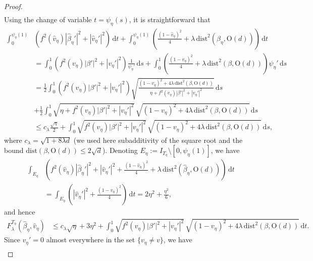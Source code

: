 \documentclass[a4paper,reqno]{amsart}
\newcommand\dist{{\mathrm{dist}}}
\newcommand\dt{{\,\mathrm{d}t}}
\theoremstyle{remark}
\newcommand\ds{{\,\mathrm{d}s}}
\newcommand{\On}{\mathrm{O}(d)}
\numberwithin{equation}{section}
\begin{document}
\begin{proof}
\begin{equation*}
\begin{split}
	\end{split}
\end{equation*}
Using the change of variable $t=\psi_\eta(s)$, it is straightforward that
\[
\begin{split}
	\int_{0}^{\psi_\eta(1)} & \left(f^2(\widehat{v}_\eta) |\widehat{\beta}_\eta'|^2  + |\widehat{v}_\eta'|^2\right)\dt + \int_{0}^{\psi_\eta(1)}  \left(\frac{(1-\widehat{v}_\eta)^2}{4} +\lambda \,\dist^2(\widehat{\beta}_\eta, \On) \right) \dt 
	\\ &
	= \int_{0}^{1}  \left(f^2({v}_\eta) |\beta'|^2  + |{v}_\eta'|^2\right)\frac{1}{\psi_\eta'}\ds  + 
	\int_{0}^{1}  \left(\frac{(1-{v}_\eta)^2}{4} +\lambda \,\dist^2(\beta, \On) \right) \psi_\eta'\ds
	\\ &
	= \frac{1}{2}\int_{0}^{1} \left(f^2({v}_\eta) |\beta'|^2  + |{v}_\eta'|^2\right)
	\sqrt{\frac{(1-v_\eta)^2 + 4 \lambda \, \dist^2(\beta, \On)}{\eta + f^2(v_\eta) |\beta'|^2+|v_\eta'|^2}}  
	\ds
	\\ & 
	+  \frac{1}{2} \int_{0}^{1}  \sqrt{\eta + f^2(v_\eta) |\beta'|^2+|v_\eta'|^2}\,  \sqrt{(1-v_\eta)^2 + 4 \lambda \, \dist^2(\beta, \On)}\ds
	\\ &
	\leq c_\lambda \frac{\sqrt{\eta}}{2}
	 +  \int_{0}^{1}  \sqrt{f^2(v_\eta) |\beta'|^2+|v_\eta'|^2}\, \sqrt{(1-v_\eta)^2 + 4 \lambda \, \dist^2(\beta, \On)}\ds,
\end{split}
\]
where $c_\lambda=\sqrt{1+8\lambda d}$
(we used here subadditivity of the square root and the bound $\dist(\beta,\On)\le 2\sqrt d$).
Denoting $E_\eta:= I_{T_\eta}  \setminus [0, \psi_\eta(1)]$, we have
\[
\begin{split}
	\int_{E_\eta} & \left(f^2(\widehat{v}_\eta) |\widehat{\beta}_\eta'|^2  + |\widehat{v}_\eta'|^2 + \frac{(1-\widehat{v}_\eta)^2}{4} +\lambda \,\dist^2(\widehat{\beta}_\eta, \On) \right) \dt 
	\\ &
	= \int_{E_\eta}  \left(|\widehat{v}_\eta'|^2 + \frac{(1-\widehat{v}_\eta)^2}{4}  \right) \dt = 2 \eta^2 + \frac{\eta^2}{6},
\end{split}
\]
and hence 
\[
\begin{split}
	F^{T_\eta}_\lambda(\widehat{\beta}_\eta, \widehat{v}_\eta) &
	\leq c_\lambda \sqrt{\eta}+3\eta^2+ \int_{0}^{1}  \sqrt{f^2(v_\eta) |\beta'|^2+|v_\eta'|^2}\, \sqrt{(1-v_\eta)^2 + 4 \lambda \, \dist^2(\beta, \On)}\dt.	 
\end{split}
\]
Since $v_\eta'=0$ almost everywhere in the set $\{v_\eta \neq v\}$, we have
\[
\begin{split}

\end{split}\]
\end{proof}
\end{document}
